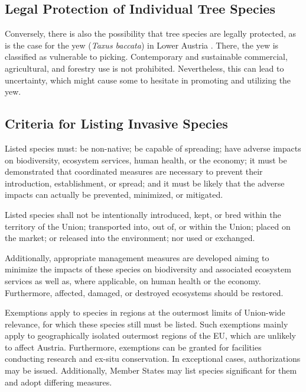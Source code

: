 \subsection{Legal Protection of Individual Tree Species}

Conversely, there is also the possibility that tree species are legally protected, as is the case for the yew (\emph{Taxus baccata}) in Lower Austria \citep{niederoesterreich2000Naturschutzgesetz,niederoesterreich2005artenschutzverordnung}. There, the yew is classified as vulnerable to picking. Contemporary and sustainable commercial, agricultural, and forestry use is not prohibited. Nevertheless, this can lead to uncertainty, which might cause some to hesitate in promoting and utilizing the yew.

\subsection{Criteria for Listing Invasive Species}

Listed species must: be non-native; be capable of spreading; have adverse impacts on biodiversity, ecosystem services, human health, or the economy; it must be demonstrated that coordinated measures are necessary to prevent their introduction, establishment, or spread; and it must be likely that the adverse impacts can actually be prevented, minimized, or mitigated.

Listed species shall not be intentionally introduced, kept, or bred within the territory of the Union; transported into, out of, or within the Union; placed on the market; or released into the environment; nor used or exchanged.

Additionally, appropriate management measures are developed aiming to minimize the impacts of these species on biodiversity and associated ecosystem services as well as, where applicable, on human health or the economy. Furthermore, affected, damaged, or destroyed ecosystems should be restored.

Exemptions apply to species in regions at the outermost limits of Union-wide relevance, for which these species still must be listed. Such exemptions mainly apply to geographically isolated outermost regions of the EU, which are unlikely to affect Austria. Furthermore, exemptions can be granted for facilities conducting research and ex-situ conservation. In exceptional cases, authorizations may be issued. Additionally, Member States may list species significant for them and adopt differing measures.

